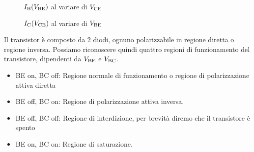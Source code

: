 \documentclass[../elettronica]{subfiles}
\begin{document}
\newpage
\begin{figure}[h]
\begin{minipage}{.47\textwidth}
    \centering
    \def\vt{1}
    \def\kuno{0.001}
    \def\kdue{20}
    \caption{$I_{\text{B}}(V_{\text{BE}})$ al variare di $V_{\text{CE}}$}
    \label{graph:transistor_bjt_3d}
\end{minipage}
\begin{minipage}{.47\textwidth}
    \centering
    \def\vt{1}
    \def\kuno{1.250}
    \def\kdue{3}
    \caption{$I_{\text{C}}(V_{\text{CE}})$ al variare di $V_{\text{BE}}$}
    \label{graph:transistor_bjt_3d_2}
\end{minipage}
\end{figure}

\vspace{20pt}
\noindent Il transistor è composto da 2 diodi, ognuno polarizzabile in regione diretta o regione inversa. Possiamo riconoscere quindi
quattro regioni di funzionamento del transistore, dipendenti da $V_{\text{BE}}$ e $V_{\text{BC}}$.
\begin{itemize}
    \item BE on, BC off: Regione normale di funzionamento o regione di polarizzazione attiva diretta
    \item BE off, BC on: Regione di polarizzazione attiva inversa.
    \item BE off, BC off: Regione di interdizione, per brevità diremo che il transistore è spento
    \item BE on, BC on: Regione di saturazione.
\end{itemize}
\end{document}

